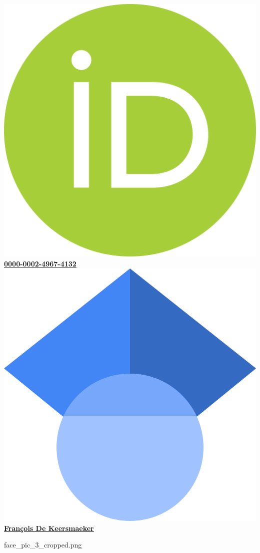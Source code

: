 \documentclass[]{deedy-resume-openfont}
\begin{document}
{\begin{minipage}[t]{0.45\textwidth}
        \includegraphics[scale=0.01]{images/orcid.png} \href{https://orcid.org/0000-0002-4967-4132}{\bf 0000-0002-4967-4132} \\
        \includegraphics[scale=0.016]{images/scholar.png} \href{https://scholar.google.com/citations?user=UrEkeo4AAAAJ&hl=fr}{\bf François De Keersmaeker}
    \end{minipage}
}{face_pic_3_cropped.png}
\end{document}
